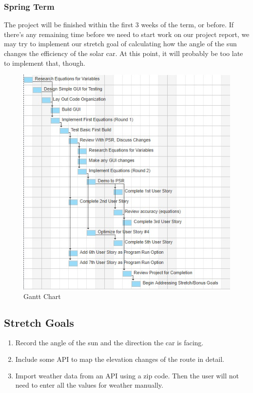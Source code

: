 \documentclass[onecolumn, draftclsnofoot,10pt, compsoc]{IEEEtran}
\begin{document}
        \subsubsection{Spring Term}
        The project will be finished within the first 3 weeks of the term, or before. If there's any remaining time before we need to start work on our project report, we may try to implement our stretch goal of calculating how the angle of the sun changes the efficiency of the solar car. At this point, it will probably be too late to implement that, though.
        
        \begin{figure}[!hb]
            \includegraphics{461Chartcut.jpg}
            \caption{Gantt Chart}
            \label{fig:Gantt}
        \end{figure}
        
    \subsection{Stretch Goals}
    \begin{enumerate}
        \item Record the angle of the sun and the direction the car is facing.
        \item Include some API to map the elevation changes of the route in detail. 
        \item Import weather data from an API using a zip code. Then the user will not need to enter all the values for weather manually.
    \end{enumerate}
    
    
\end{document}
